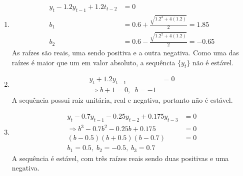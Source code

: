 \begin{enumerate}
\begin{enumerate}
		\item %
		\begin{align*}
			y_t-1.2y_{t-1}+1.2t_{t-2}&=0\\
			b_1&=0.6+\frac{\sqrt{1.2^2+4(1.2)}}{2}=1.85\\
			b_2&=0.6-\frac{\sqrt{1.2^2+4(1.2)}}{2}=-0.65
			\end{align*}
		As raízes são reais, uma sendo positiva e a outra negativa. Como uma das raízes é maior que um em valor absoluto, a sequência $\{y_t\}$ não é estável.
		
		\item %
		\begin{align*}
			y_t+1.2y_{t-1}&=0\\
			\Rightarrow b+1=0,\;\;b=-1
		\end{align*}
		A sequência possui raiz unitária, real e negativa, portanto não é estável.
		
		\item %
		
		\begin{align*}
			y_t-0.7y_{t-1}-0.25y_{t-2}+0.175y_{t-3}&=0\\
			\Rightarrow  b^3-0.7b^2-0.25b+0.175&=0\\
			(b-0.5)(b+0.5)(b-0.7)&=0\\
			b_1=0.5,\;b_2=-0.5,\;b_3=0.7
		\end{align*}
		A sequência é estável, com três raízes reais sendo duas positivas e uma negativa.
	\end{enumerate}
		
	
	
	
\end{enumerate}

